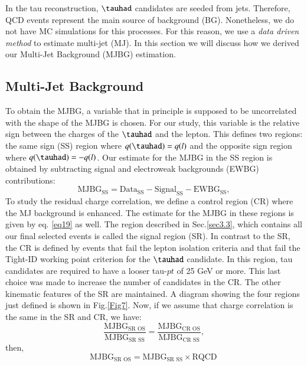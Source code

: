 In the tau reconstruction, $\tauhad$ candidates are seeded from jets. Therefore, QCD events represent the main source of background (BG). Nonetheless, we do not have MC simulations for this processes. For this reason, we use a \textit{data driven method} to estimate multi-jet (MJ). In this section we will discuss how we derived our Multi-Jet Background (MJBG) estimation.

\subsection{Multi-Jet Background}
To obtain the MJBG, a variable that in principle is supposed to be uncorrelated with the shape of the MJBG is chosen. For our study, this variable is the relative sign between the charges of the $\tauhad$ and the lepton. This defines two regions: the same sign (SS) region where $q(\tauhad)=q(l)$ and the opposite sign region where $q(\tauhad)=-q(l)$. Our estimate for the MJBG in the SS region is obtained by subtracting signal and electroweak backgrounds (EWBG) contributions:
\begin{equation}
\text{MJBG}_{\text{SS}}=\text{Data}_{\text{SS}}-\text{Signal}_{\text{SS}}-\text{EWBG}_{\text{SS}},
\label{eq19}
\end{equation}
To study the residual charge correlation, we define a control region (CR) where the MJ background is enhanced. The estimate for the MJBG in these regions is given by eq. \ref{eq19} as well. The region described in Sec.\ref{sec3.3}, which contains all our final selected events is called the signal region (SR). In contrast to the SR, the CR is defined by events that fail the lepton isolation criteria and that fail the Tight-ID working point criterion for the $\tauhad$ candidate. In this region, tau candidates are required to have a looser tau-$pt$ of 25 GeV or more. This last choice was made to increase the number of candidates in the CR. The other kinematic features of the SR are maintained. A diagram showing the four regions just defined is shown in Fig.\ref{Fig7}. Now, if we assume that charge correlation is the same in the SR and CR, we have:
 \begin{equation}
 \frac{\text{MJBG}_{\text{SR OS}}}{\text{MJBG}_{\text{SR SS}}}=\frac{\text{MJBG}_{\text{CR OS}}}{\text{MJBG}_{\text{CR SS}}},
 \end{equation}
then,
 \begin{equation}
\text{MJBG}_{\text{SR OS}}=\text{MJBG}_{\text{SR SS}}\times \text{RQCD}\,
\label{eq36}
\end{equation}
